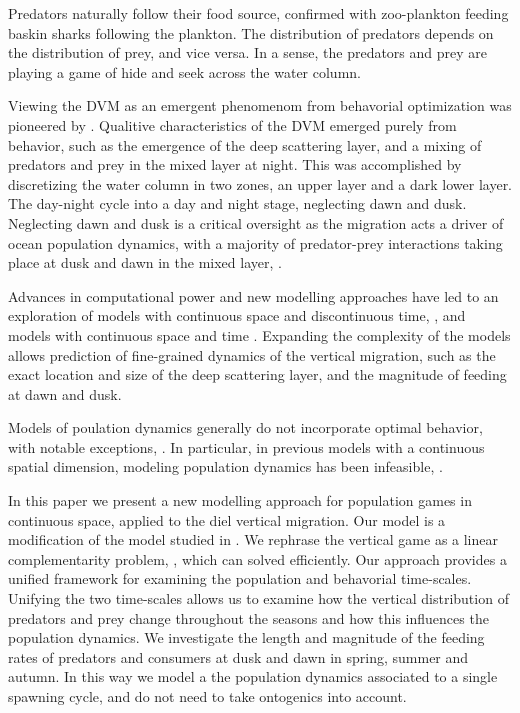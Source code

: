 Predators naturally follow their food source, confirmed \citep{sims2005habitat} with zoo-plankton feeding baskin sharks following the plankton. The distribution of predators depends on the distribution of prey, and vice versa. In a sense, the predators and prey are playing a game of hide and seek across the water column.


Viewing the DVM as an emergent phenomenom from behavorial optimization was pioneered by \citep{iwasa1982vertical}. Qualitive characteristics of the DVM emerged purely from behavior, such as the emergence of the deep scattering layer, and a mixing of predators and prey in the mixed layer at night. This was accomplished by discretizing the water column in two zones, an upper layer and a dark lower layer. The day-night cycle into a day and night stage, neglecting dawn and dusk. Neglecting dawn and dusk is a critical oversight as the migration acts  a driver of ocean population dynamics, with a majority of predator-prey interactions taking place at dusk and dawn in the mixed layer, \citep{benoit2014critical}.

Advances in computational power and new modelling approaches have led to an exploration of models with continuous space and discontinuous time, \citep{jerome}, and models with continuous space and time \citep{verticalmigration}.
Expanding the complexity of the models allows prediction of fine-grained dynamics of the vertical migration, such as the exact location and size of the deep scattering layer, and the magnitude of feeding at dawn and dusk.

Models of poulation dynamics generally do not incorporate optimal behavior, with notable exceptions, \citep{Krivan1998,genkai2007macrophyte}. In particular, in previous models with a continuous spatial dimension, modeling population dynamics has been infeasible, \citep{pinti2019trophic}.


In this paper we present a new modelling approach for population games in continuous space, applied to the diel vertical migration. Our model is a modification of the model studied in \citep{verticalmigration}. We rephrase the vertical game as a linear complementarity problem, \citep{miller1991copositive}, which can solved efficiently. Our approach provides a unified framework for examining the population and behavorial time-scales.  Unifying the two time-scales allows us to examine how the vertical distribution of predators and prey change throughout the seasons and how this influences the population dynamics. We investigate the length and magnitude of the feeding rates of predators and consumers at dusk and dawn in spring, summer and autumn. In this way we model a the population dynamics associated to a single spawning cycle, and do not need to take ontogenics into account.


